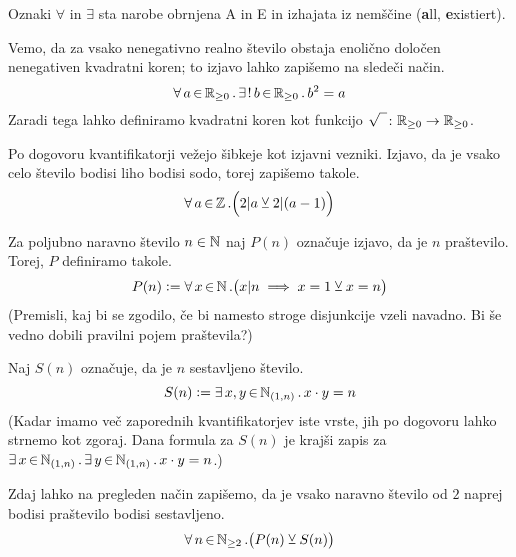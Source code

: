 		Oznaki $\forall$ in $\exists$ sta narobe obrnjena A in E in izhajata iz nemščine (\textbf{a}ll, \textbf{e}xistiert).
		
		\begin{zgled}
			Vemo, da za vsako nenegativno realno število obstaja enolično določen nenegativen kvadratni koren; to izjavo lahko zapišemo na sledeči način.
			\[\xall{a}{\RR_{\geq 0}}\xexactlyone{b}{\RR_{\geq 0}}{b^2 = a}\]
			Zaradi tega lahko definiramo kvadratni koren kot funkcijo $\sqrt{\phantom{I}}\colon \RR_{\geq 0} \to \RR_{\geq 0}$.
		\end{zgled}
		
		Po dogovoru kvantifikatorji vežejo šibkeje kot izjavni vezniki. Izjavo, da je vsako celo število bodisi liho bodisi sodo, torej zapišemo takole.
		\[\all[2]{a}{\ZZ}{2 | a \xor 2 | (a-1)}\]
		
		
		\begin{zgled}
			Za poljubno naravno število $n \in \NN$ naj $P(n)$ označuje izjavo, da je $n$ praštevilo. Torej, $P$ definiramo takole.
			\[P(n) \dfeq \all[1]{x}{\NN}{x | n \implies x = 1 \xor x = n}\]
			(Premisli, kaj bi se zgodilo, če bi namesto stroge disjunkcije vzeli navadno. Bi še vedno dobili pravilni pojem praštevila?)
			
			Naj $S(n)$ označuje, da je $n$ sestavljeno število.
			\[S(n) \dfeq \xsome{x, y}{\intoo[\NN]{1}{n}}{x \cdot y = n}\]
			(Kadar imamo več zaporednih kvantifikatorjev iste vrste, jih po dogovoru lahko strnemo kot zgoraj. Dana formula za $S(n)$ je krajši zapis za $\xsome{x}{\intoo[\NN]{1}{n}}\xsome{y}{\intoo[\NN]{1}{n}}{x \cdot y = n}$.)
			
			Zdaj lahko na pregleden način zapišemo, da je vsako naravno število od $2$ naprej bodisi praštevilo bodisi sestavljeno.
			\[\all[1]{n}{\NN_{\geq 2}}{P(n) \xor S(n)}\]
		\end{zgled}
		
	
